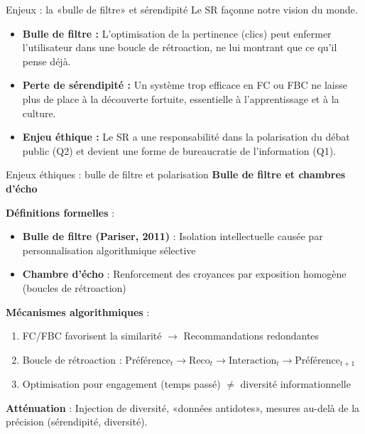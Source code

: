 \documentclass[9pt, aspectratio=169]{beamer}
\begin{document}
\begin{frame}{Enjeux : la «bulle de filtre» et sérendipité}
    Le SR façonne notre vision du monde.
    \begin{itemize}
        \item \textbf{Bulle de filtre :} L'optimisation de la pertinence (clics) peut enfermer l'utilisateur dans une boucle de rétroaction, ne lui montrant que ce qu'il pense déjà.
        \item \textbf{Perte de sérendipité :} Un système trop efficace en FC ou FBC ne laisse plus de place à la découverte fortuite, essentielle à l'apprentissage et à la culture.
        \item \textbf{Enjeu éthique :} Le SR a une responsabilité dans la polarisation du débat public (Q2) et devient une forme de bureaucratie de l'information (Q1).
    \end{itemize}
\end{frame}

\begin{frame}{Enjeux éthiques : bulle de filtre et polarisation}
    \textbf{Bulle de filtre et chambres d'écho}
    
    \vspace{0.3cm}
    \textbf{Définitions formelles} :
    \begin{itemize}
        \item \textbf{Bulle de filtre (Pariser, 2011)} : Isolation intellectuelle causée par personnalisation algorithmique sélective
        \item \textbf{Chambre d'écho} : Renforcement des croyances par exposition homogène (boucles de rétroaction)
    \end{itemize}
    
    \vspace{0.3cm}
    \textbf{Mécanismes algorithmiques} :
    \begin{enumerate}
        \item FC/FBC favorisent la similarité $\rightarrow$ Recommandations redondantes
        \item Boucle de rétroaction : \(\text{Préférence}_t \rightarrow \text{Reco}_t \rightarrow \text{Interaction}_t \rightarrow \text{Préférence}_{t+1}\)
        \item Optimisation pour engagement (temps passé) \(\neq\) diversité informationnelle
    \end{enumerate}
    
    \vspace{0.3cm}
    \textbf{Atténuation} : Injection de diversité, «données antidotes», mesures au-delà de la précision (sérendipité, diversité).
\end{frame}
\end{document}
